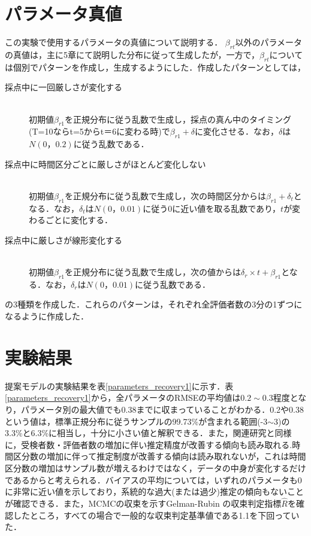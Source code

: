\documentclass[a4paper,11pt,oneside,openany]{jsbook}
\begin{document}
\section{パラメータ真値}
この実験で使用するパラメータの真値について説明する．
$\beta_{rt}$以外のパラメータの真値は，主に5章にて説明した分布に従って生成したが，一方で，$\beta_{rt}$については個別でパターンを作成し，生成するようにした．作成したパターンとしては，
\begin{description}
\item [採点中に一回厳しさが変化する]\mbox{}\\
初期値$\beta_{r1}$を正規分布に従う乱数で生成し，採点の真ん中のタイミング(T=10ならt=5からt＝6に変わる時)で$\beta_{r1}+\delta$に変化させる．なお，$\delta$は$N(0，0.2)$に従う乱数である．
\item [採点中に時間区分ごとに厳しさがほとんど変化しない]\mbox{}\\
初期値$\beta_{r1}$を正規分布に従う乱数で生成し，次の時間区分からは$\beta_{r1}+\delta_t$となる．なお，$\delta_t$は$N(0，0.01)$に従う0に近い値を取る乱数であり，$t$が変わるごとに変化する．
\item [採点中に厳しさが線形変化する]\mbox{}\\
初期値$\beta_{r1}$を正規分布に従う乱数で生成し，次の値からは$\delta_r \times t +\beta_{r1}$となる．なお，$\delta_r$は$N(0，0.01)$に従う乱数である．
\end{description}
の3種類を作成した．これらのパターンは，それぞれ全評価者数の3分の1ずつになるように作成した．
\section{実験結果}
提案モデルの実験結果を表\ref{parameters_recovery1}に示す．表\ref{parameters_recovery1}から，全パラメータのRMSEの平均値は$0.2\sim0.3$程度となり，パラメータ別の最大値でも0.38までに収まっていることがわかる．0.2や0.38という値は，標準正規分布に従うサンプルの99.73\%が含まれる範囲(-3$\sim$3)の3.3\%と6.3\%に相当し，十分に小さい値と解釈できる．また，関連研究\cite{UtoUeno,YagiUto,IRTUtoUeno}と同様に，受検者数・評価者数の増加に伴い推定精度が改善する傾向も読み取れる.時間区分数の増加に伴って推定制度が改善する傾向は読み取れないが，これは時間区分数の増加はサンプル数が増えるわけではなく，データの中身が変化するだけであるからと考えられる．バイアスの平均については，いずれのパラメータも0に非常に近い値を示しており，系統的な過大(または過少)推定の傾向もないことが確認できる．また，MCMCの収束を示すGelman-Rubin の収束判定指標$ \hat{R} $\cite{RhatRubin,RhatCarlin}を確認したところ，すべての場合で一般的な収束判定基準値である1.1を下回っていた．
\end{document}
